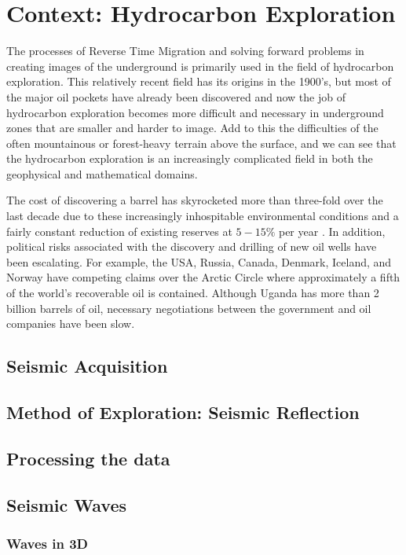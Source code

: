 \newpage
\section{Context: Hydrocarbon Exploration}

The processes of Reverse Time Migration and solving forward problems in creating images of the underground is primarily used in the field of hydrocarbon exploration. This relatively recent field has its origins in the 1900's, but most of the major oil pockets have already been discovered and now the job of hydrocarbon exploration becomes more difficult and necessary in underground zones that are smaller and harder to image. Add to this the difficulties of the often mountainous or forest-heavy terrain above the surface, and we can see that the hydrocarbon exploration is an increasingly complicated field in both the geophysical and mathematical domains. 

The cost of discovering a barrel has skyrocketed more than three-fold over the last decade due to these increasingly inhospitable environmental conditions and a fairly constant reduction of existing reserves at $5-15\%$ per year \cite{hydrocarbonExplorationCosts}. In addition, political risks associated with the discovery and drilling of new oil wells have been escalating. For example, the USA, Russia, Canada, Denmark, Iceland, and Norway have competing claims over the Arctic Circle where approximately a fifth of the world's recoverable oil is contained. Although Uganda has more than 2 billion barrels of oil, necessary negotiations between the government and oil companies have been slow.

\subsection{Seismic Acquisition}



\subsection{Method of Exploration: Seismic Reflection}

\subsection{Processing the data}

\subsection{Seismic Waves}
\subsubsection{Waves in 3D}



















